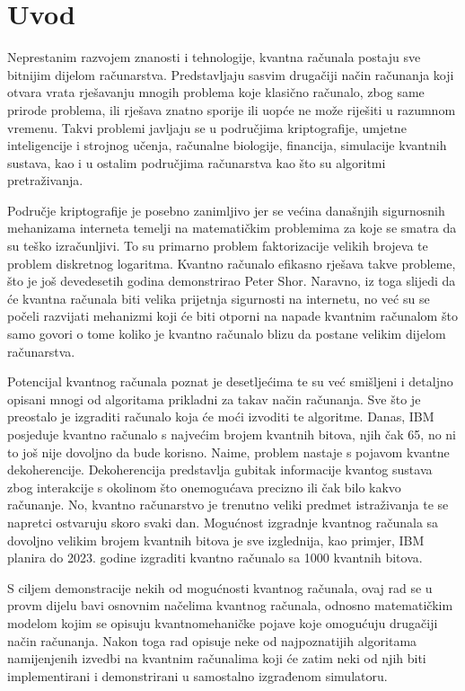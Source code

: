 \chapter{Uvod}
\label{ch:uvod}
Neprestanim razvojem znanosti i tehnologije, kvantna računala postaju sve bitnijim dijelom računarstva. Predstavljaju sasvim drugačiji način računanja koji otvara vrata rješavanju mnogih problema koje klasično računalo, zbog same prirode problema, ili rješava znatno sporije ili uopće ne može riješiti u razumnom vremenu. Takvi problemi javljaju se u područjima kriptografije, umjetne inteligencije i strojnog učenja, računalne biologije, financija, simulacije kvantnih sustava, kao i u ostalim područjima računarstva kao što su algoritmi pretraživanja.

Područje kriptografije je posebno zanimljivo jer se većina današnjih sigurnosnih mehanizama interneta temelji na matematičkim problemima za koje se smatra da su teško izračunljivi. To su primarno problem faktorizacije velikih brojeva te problem diskretnog logaritma. Kvantno računalo efikasno rješava takve probleme, što je još devedesetih godina demonstrirao Peter Shor\citep{Shor:1994jg}. Naravno, iz toga slijedi da će kvantna računala biti velika prijetnja sigurnosti na internetu, no već su se počeli razvijati mehanizmi koji će biti otporni na napade kvantnim računalom što  samo govori o tome koliko je kvantno računalo blizu da postane velikim dijelom računarstva.

Potencijal kvantnog računala poznat je desetljećima te su već smišljeni i detaljno opisani mnogi od algoritama prikladni za takav način računanja. Sve što je preostalo je izgraditi računalo koja će moći izvoditi te algoritme. Danas, IBM posjeduje kvantno računalo s najvećim brojem kvantnih bitova, njih čak 65, no ni to još nije dovoljno da bude korisno. Naime, problem nastaje s pojavom kvantne dekoherencije. Dekoherencija predstavlja gubitak informacije kvantog sustava zbog interakcije s okolinom što onemogućava precizno ili čak bilo kakvo računanje. No, kvantno računarstvo je trenutno veliki predmet istraživanja te se napretci ostvaruju skoro svaki dan. Mogućnost izgradnje kvantnog računala sa dovoljno velikim brojem kvantnih bitova je sve izglednija, kao primjer, IBM planira do 2023. godine izgraditi kvantno računalo sa 1000 kvantnih bitova\citep{ibm:quantum}.

S ciljem demonstracije nekih od mogućnosti kvantnog računala, ovaj rad se u provm dijelu bavi osnovnim načelima kvantnog računala, odnosno matematičkim modelom kojim se opisuju kvantnomehaničke pojave koje omogućuju drugačiji način računanja. Nakon toga rad opisuje neke od najpoznatijih algoritama namijenjenih izvedbi na kvantnim računalima koji će zatim neki od njih biti implementirani i demonstrirani u samostalno izgrađenom simulatoru.